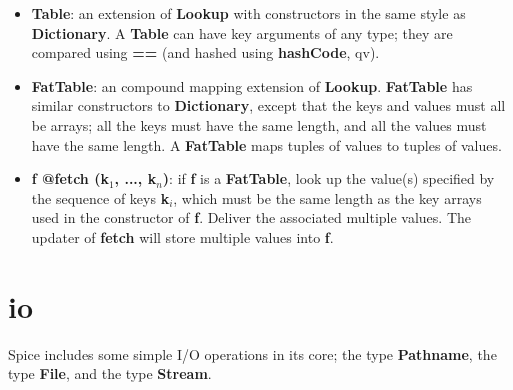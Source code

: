 \documentclass{report}
\begin{document}
\begin{itemize}
\item {\bf Table}: an extension of {\bf Lookup} with constructors in the same style as
{\bf Dictionary}. A {\bf Table} can have key arguments of any type; they are compared
using {\bf ==} (and hashed using {\bf hashCode}, qv).

\item {\bf FatTable}: an compound mapping extension of {\bf Lookup}. {\bf FatTable} has similar
constructors to {\bf Dictionary}, except that the keys and values must all be
arrays; all the keys must have the same length, and all the values must have
the same length. A {\bf FatTable} maps tuples of values to tuples of values.

\item {\bf f @fetch (k$_ 1$, ..., k$_ n$)}: if {\bf f} is a {\bf FatTable}, look up the value(s)
specified by the sequence of keys {\bf k$_ i$}, which must be the same length as the
key arrays used in the constructor of {\bf f}. Deliver the associated multiple
values. The updater of {\bf fetch} will store multiple values into {\bf f}.

\end{itemize}

\section{io}


Spice includes some simple I/O operations in its core; the type {\bf Pathname},
the type {\bf File}, and the type {\bf Stream}.
\end{document}
